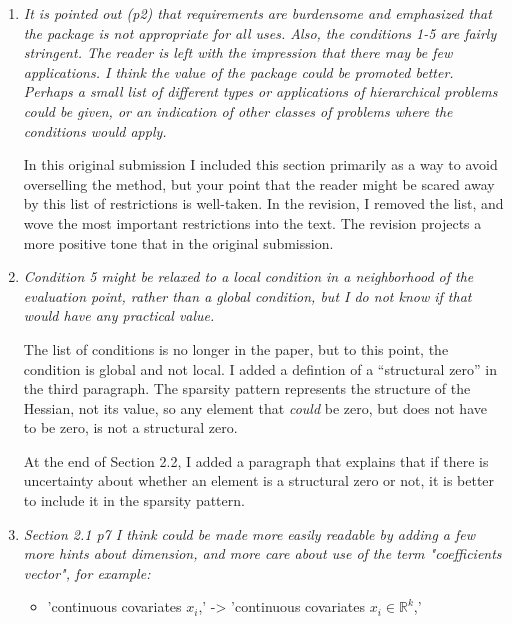 \documentclass{article}
\newcommand{\Real}[1]{\mathbb{R}^{#1}}
\newenvironment{revQuote}{\itshape}{\vspace{\baselineskip}}
\newenvironment{response}{\normalfont}{\vspace{\baselineskip}}
\begin{document}
\begin{enumerate}[align=left]
\item \begin{revQuote}
It is pointed out (p2) that requirements are burdensome and emphasized
that the package is not appropriate for all uses. Also, the conditions 1-5
are fairly stringent. The reader is left with the impression that there may
be few applications. I think the value of the package could be promoted
better. Perhaps a small list of different types or applications of
hierarchical problems could be given, or an indication of other classes of
problems where the conditions would apply.
    
  \end{revQuote}

  \begin{response}
In this original submission I included this section primarily as a way to avoid overselling the
method, but your point that the reader might be scared away by this list of
restrictions is well-taken.  In the revision, I removed the list, and
wove the most important restrictions into the text.  The revision projects a more
positive tone that in the original submission.
\end{response}

\item \begin{revQuote}
Condition 5 might be relaxed to a local condition in a neighborhood of
the evaluation point, rather than a global condition, but I do not know if
that would have any practical value.
  \end{revQuote}

\begin{response}
  The list of conditions is no longer in the paper, but to this point, the
  condition is global and not local.  I added a defintion of a ``structural zero'' in the third
  paragraph. The sparsity pattern represents the structure of the
  Hessian, not its value, so any element that \emph{could} be zero,
  but does not have to be zero, is not a structural zero.

   At the end of Section 2.2, I added a paragraph that explains that
   if there is uncertainty about whether an element is a structural
   zero or not, it is better to include it in the sparsity pattern.
\end{response}

\item \begin{revQuote}
Section 2.1 p7 I think could be made more easily readable by adding a few
more hints about dimension, and more care about use of the term 
"coefficients vector", for example:
\begin{itemize}
  \item 'continuous covariates $x_i$,' -> 'continuous covariates $x_i \in
\Real{k}$,'


\end{itemize}
\end{revQuote}
\end{enumerate}
\end{document}

